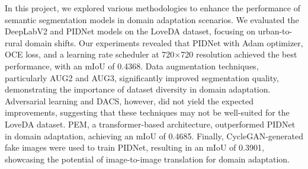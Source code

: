 \documentclass[10pt,twocolumn,letterpaper]{article}
\begin{document}
In this project, we explored various methodologies to enhance the performance of semantic segmentation models in domain adaptation scenarios. We evaluated the DeepLabV2 and PIDNet models on the LoveDA dataset, focusing on urban-to-rural domain shifts. Our experiments revealed that PIDNet with Adam optimizer, OCE loss, and a learning rate scheduler at 720×720 resolution achieved the best performance, with an mIoU of 0.4368. Data augmentation techniques, particularly AUG2 and AUG3, significantly improved segmentation quality, demonstrating the importance of dataset diversity in domain adaptation. Adversarial learning and DACS, however, did not yield the expected improvements, suggesting that these techniques may not be well-suited for the LoveDA dataset. PEM, a transformer-based architecture, outperformed PIDNet in domain adaptation, achieving an mIoU of 0.4685. Finally, CycleGAN-generated fake images were used to train PIDNet, resulting in an mIoU of 0.3901, showcasing the potential of image-to-image translation for domain adaptation. 



\end{document}
